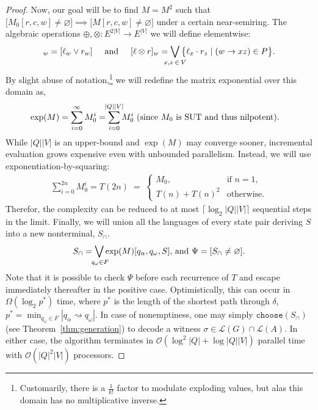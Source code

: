 \documentclass[sigplan,review,acmsmall,nonacm,screen,anonymous]{acmart}\settopmatter{printfolios=false,printccs=false,printacmref=false}
\begin{document}
\begin{proof}[Proof]
  Now, our goal will be to find $M=M^2$ such that $\big[M_0[r, c, w] \neq \varnothing\big] \implies \big[M[r, c, w] \neq \varnothing\big]$ under a certain near-semiring. The algebraic operations $\oplus, \otimes: E^{2|V|} \rightarrow E^{|V|}$ we will define elementwise:
  \begin{equation}
    [\ell \oplus r]_w  = [\ell_w \lor r_w]\hspace{0.5cm}\text{and}\hspace{0.5cm}
    [\ell \otimes r]_w = \bigvee_{\mathclap{x, z\:\in\:V}}\big\{\ell_x \cdot r_z \mid (w \rightarrow xz) \in P\big\}.
  \end{equation}
  By slight abuse of notation,\footnote{Customarily, there is a $\frac{1}{k!}$ factor to modulate exploding values, but alas this domain has no multiplicative inverse.} we will redefine the matrix exponential over this domain as,
  \begin{align}
    \exp(M) &= \sum_{i = 0}^\infty M_0^i = \sum_{i = 0}^{\mathclap{|Q||V|}} M_0^i \text { (since $M_0$ is SUT and thus nilpotent).}
  \end{align}
  While $|Q||V|$ is an upper-bound and $\exp(M)$ may converge sooner, incremental evaluation grows expensive even with unbounded parallelism. Instead, we will use exponentiation-by-squaring:
  \begin{align}
    \sum_{i = 0}^{2n} M_0^i = T(2n) \;=\; \begin{cases}
       M_0, & \text{if } n = 1,\\
       T(n) + T(n)^2 & \text{otherwise}.
    \end{cases}
  \end{align}
  Therefor, the complexity can be reduced to at most $\lceil\log_2 |Q||V|\rceil$ sequential steps in the limit. Finally, we will union all the languages of every state pair deriving $S$ into a new nonterminal, $S_\cap$.
  \begin{align}
    S_\cap = \bigvee_{\mathclap{\:q_\omega \in F}}\exp(M)[q_\alpha, q_\omega, S] \text{, and } \Psi = [S_\cap \neq \varnothing].
  \end{align}
  Note that it is possible to check $\Psi$ before each recurrence of $T$ and escape immediately thereafter in the positive case. Optimistically, this can occur in $\Omega(\log_2 p^*)$ time, where $p^*$ is the length of the shortest path through $\delta$, $p^*=\min_{q_\omega \in F}|q_\alpha\rightsquigarrow q_\omega|$. In case of nonemptiness, one may simply $\texttt{choose}(S_\cap)$ (see Theorem~\ref{thm:generation}) to decode a witness $\sigma \in \mathcal{L}(G)\cap\mathcal{L}(A)$. In either case, the algorithm terminates in $\mathcal{O}(\log^2 |Q| + \log |Q||V|)$ parallel time with $\mathcal{O}(|Q|^2|V|)$ processors.
\end{proof}\clearpage
\end{document}
